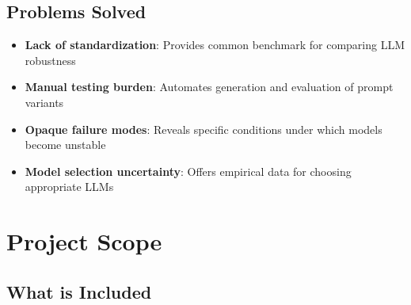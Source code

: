 \documentclass[11pt,a4paper]{article}
\begin{document}
\subsection{Problems Solved}

\begin{itemize}[leftmargin=*]
    \item \textbf{Lack of standardization}: Provides common benchmark for comparing LLM robustness
    \item \textbf{Manual testing burden}: Automates generation and evaluation of prompt variants
    \item \textbf{Opaque failure modes}: Reveals specific conditions under which models become unstable
    \item \textbf{Model selection uncertainty}: Offers empirical data for choosing appropriate LLMs
\end{itemize}

\section{Project Scope}

\subsection{What is Included}
\end{document}
